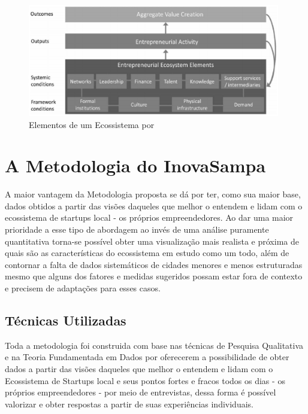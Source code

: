 \begin{figure}[!htb]
\centering
\includegraphics[width=11cm,angle=0]{figuras/elements_of_an_ecosystem}
\caption{Elementos de um Ecossistema por }
\label{figure:elements_of_an_ecosystem}
\end{figure}

\section{A Metodologia do InovaSampa}
\label{section:metodologia_do_inovasampa}

A maior vantagem da Metodologia proposta se dá por ter, como sua maior base, dados obtidos a partir das visões daqueles que melhor o entendem e lidam com o ecossistema de startups local - os próprios empreendedores. Ao dar uma maior prioridade a esse tipo de abordagem ao invés de uma análise puramente quantitativa torna-se possível obter uma visualização mais realista e próxima de quais são as características do ecossistema em estudo como um todo, além de contornar a falta de dados sistemáticos de cidades menores e menos estruturadas mesmo que alguns dos fatores e medidas sugeridos possam estar fora de contexto e precisem de adaptações para esses casos.

\subsection{Técnicas Utilizadas}
\label{subsection:tecnicas_utilizadas}

Toda a metodologia foi construida com base nas técnicas de Pesquisa Qualitativa e na Teoria Fundamentada em Dados por oferecerem a possibilidade de obter dados a partir das visões daqueles que melhor o entendem e lidam com o Ecossistema de Startups local e seus pontos fortes e fracos todos os dias - os próprios empreendedores - por meio de entrevistas, dessa forma é possível valorizar e obter respostas a partir de suas experiências individuais.

